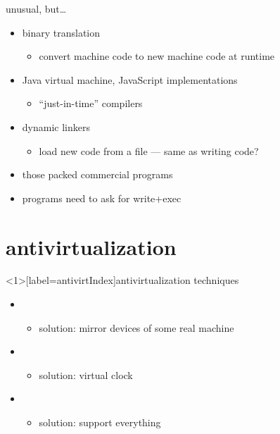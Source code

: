 \begin{frame}{unusual, but\ldots}
    \begin{itemize}
    \item binary translation
        \begin{itemize}
        \item convert machine code to new machine code at runtime
        \end{itemize}
    \item Java virtual machine, JavaScript implementations
        \begin{itemize}
        \item ``just-in-time'' compilers
        \end{itemize}
    \item dynamic linkers
        \begin{itemize}
        \item load new code from a file --- same as writing code?
        \end{itemize}
    \item those packed commercial programs
    \vspace{.5cm}
    \item programs need to  ask for write+exec
    \end{itemize}
\end{frame}

\section{antivirtualization}


\begin{frame}<1>[label=antivirtIndex]{antivirtualization techniques}
    \begin{itemize}
    \item {}
        \begin{itemize}
        \item<3> solution: mirror devices of some real machine
        \end{itemize}
    \item {}
        \begin{itemize}
        \item<5> solution: virtual clock
        \end{itemize}
    \item {}
        \begin{itemize}
        \item<7> solution: support everything
        \end{itemize}
    \end{itemize}
\end{frame}

